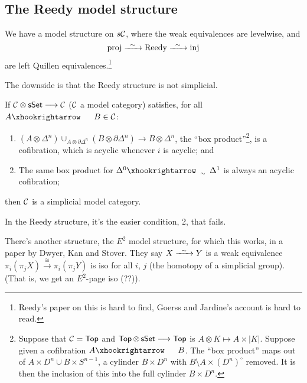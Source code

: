 \begin{InnaSimplicalModelCats}
\subsection*{The Reedy model structure}
\begin{thm*}
We have a model structure on $s\mathcal{C}$, where the weak equivalences are levelwise, and
\[\textup{proj}\weakequiv\textup{Reedy}\weakequiv\textup{inj}\]
are left Quillen equivalences.\footnote{Reedy's paper on this is hard to find, Goerss and Jardine's account is hard to read.}
\end{thm*}
\noindent The downside is that the Reedy structure is not simplicial.
\begin{thm*}
If $\mathcal{C}\otimes \operatorname{{\mathsf{sSet}}}\longrightarrow \mathcal{C}$ ($\mathcal{C}$ a model category) satisfies, for all $A\cofibration B\in\calC$:
\begin{enumerate}\squishlist
\item $(A\otimes \Delta^n)\cup_{A\otimes\partial\Delta^n}(B\otimes\partial\Delta^n)\to B\otimes\Delta^n$, the ``box product''\footnote{Suppose that $\mathcal{C}=\operatorname{{\mathsf{Top}}}$ and $\operatorname{{\mathsf{Top}}}\otimes\operatorname{{\mathsf{sSet}}}\longrightarrow\operatorname{{\mathsf{Top}}}$ is $A\otimes K\mapsto A\times|K|$. Suppose given a cofibration $A\cofibration B$. The ``box product'' maps out of $A\times D^n\cup B\times S^{n-1}$, a cylinder $B\times D^n$ with $B\setminus A\times (D^n)^\circ$ removed. It is then the inclusion of this into the full cylinder $B\times D^n$. }, is a cofibration, which is acyclic whenever $i$ is acyclic; and
\item The same box product for $\Delta^0\acycliccofibration\Delta^1$ is always an acyclic cofibration;
\end{enumerate}
then $\mathcal{C}$ is a simplicial model category.
\end{thm*}
\noindent In the Reedy structure, it's the easier condition, 2, that fails.

There's another structure, the $E^2$ model structure, for which this works, in a paper by Dwyer, Kan and Stover. They say $X\weakequiv Y$ is a weak equivalence \Iff $\pi_i(\pi_j X)\overset{\cong}{\to}\pi_i(\pi_j  Y)$ is iso for all $i$, $j$ (the homotopy of a simplicial group). (That is, we get an $E^2$-page iso (??)).

\end{InnaSimplicalModelCats}

